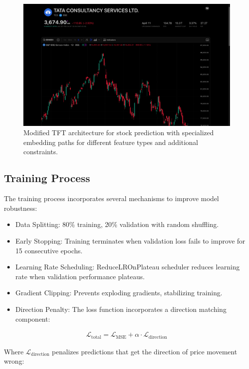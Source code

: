 \documentclass[conference]{IEEEtran}
\begin{document}
\begin{figure}[h]
\centering
\includegraphics[width=0.9\linewidth]{tft_architecture.png}
\caption{Modified TFT architecture for stock prediction with specialized embedding paths for different feature types and additional constraints.}
\label{fig:tft_architecture}
\end{figure}

\subsection{Training Process}
The training process incorporates several mechanisms to improve model robustness:

\begin{itemize}
\item Data Splitting: 80\% training, 20\% validation with random shuffling.
\item Early Stopping: Training terminates when validation loss fails to improve for 15 consecutive epochs.
\item Learning Rate Scheduling: ReduceLROnPlateau scheduler reduces learning rate when validation performance plateaus.
\item Gradient Clipping: Prevents exploding gradients, stabilizing training.
\item Direction Penalty: The loss function incorporates a direction matching component:
\end{itemize}

\begin{equation}
\begin{aligned}
\mathcal{L}_{\text{total}} = \mathcal{L}_{\text{MSE}} + \alpha \cdot \mathcal{L}_{\text{direction}}
\end{aligned}
\end{equation}

Where $\mathcal{L}_{\text{direction}}$ penalizes predictions that get the direction of price movement wrong:
\end{document}
